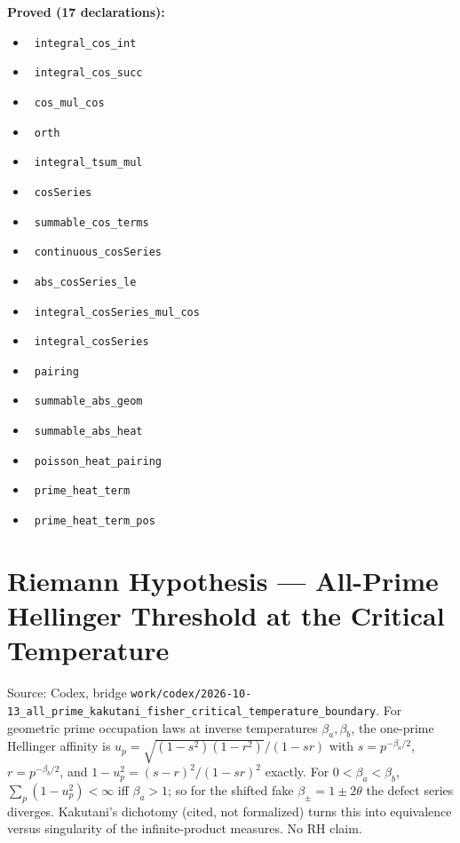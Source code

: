 \documentclass{report}
\theoremstyle{definition}
\begin{document}
\noindent\textbf{Proved (17 declarations):}
\begin{itemize}
  \item {}\leanok\ \texttt{integral\_cos\_int}
  \item {}\leanok\ \texttt{integral\_cos\_succ}
  \item {}\leanok\ \texttt{cos\_mul\_cos}
  \item {}\leanok\ \texttt{orth}
  \item {}\leanok\ \texttt{integral\_tsum\_mul}
  \item {}\leanok\ \texttt{cosSeries}
  \item {}\leanok\ \texttt{summable\_cos\_terms}
  \item {}\leanok\ \texttt{continuous\_cosSeries}
  \item {}\leanok\ \texttt{abs\_cosSeries\_le}
  \item {}\leanok\ \texttt{integral\_cosSeries\_mul\_cos}
  \item {}\leanok\ \texttt{integral\_cosSeries}
  \item {}\leanok\ \texttt{pairing}
  \item {}\leanok\ \texttt{summable\_abs\_geom}
  \item {}\leanok\ \texttt{summable\_abs\_heat}
  \item {}\leanok\ \texttt{poisson\_heat\_pairing}
  \item {}\leanok\ \texttt{prime\_heat\_term}
  \item {}\leanok\ \texttt{prime\_heat\_term\_pos}
\end{itemize}

\section{Riemann Hypothesis --- All-Prime Hellinger Threshold at the Critical Temperature}
Source: Codex, bridge \texttt{work/codex/2026-10-13\_all\_prime\_kakutani\_fisher\_critical\_temperature\_boundary}. For geometric prime occupation laws at inverse temperatures $\beta_a,\beta_b$, the one-prime Hellinger affinity is $u_p=\sqrt{(1-s^2)(1-r^2)}/(1-sr)$ with $s=p^{-\beta_a/2}$, $r=p^{-\beta_b/2}$, and $1-u_p^2=(s-r)^2/(1-sr)^2$ exactly. For $0<\beta_a<\beta_b$, $\sum_p(1-u_p^2)<\infty$ iff $\beta_a>1$; so for the shifted fake $\beta_\pm=1\pm2\theta$ the defect series diverges. Kakutani's dichotomy (cited, not formalized) turns this into equivalence versus singularity of the infinite-product measures. No RH claim.
\end{document}
